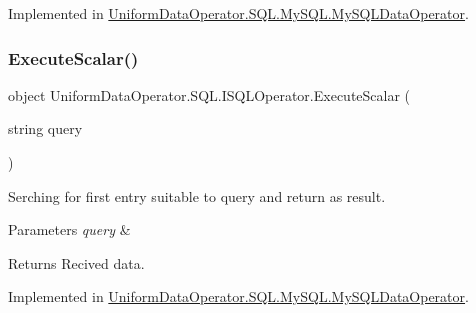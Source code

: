 Implemented in \mbox{\hyperlink{class_uniform_data_operator_1_1_s_q_l_1_1_my_s_q_l_1_1_my_s_q_l_data_operator_aef1f1d171818fffe2f0c0642de27596d}{Uniform\+Data\+Operator.\+S\+Q\+L.\+My\+S\+Q\+L.\+My\+S\+Q\+L\+Data\+Operator}}.

\mbox{\label{interface_uniform_data_operator_1_1_s_q_l_1_1_i_s_q_l_operator_a8a39200efe4781edee40151982940f75}} 
\subsubsection{\texorpdfstring{Execute\+Scalar()}{ExecuteScalar()}}
{\footnotesize\ttfamily object Uniform\+Data\+Operator.\+S\+Q\+L.\+I\+S\+Q\+L\+Operator.\+Execute\+Scalar (\begin{DoxyParamCaption}\item[{string}]{query }\end{DoxyParamCaption})}



Serching for first entry suitable to query and return as result. 


\begin{DoxyParams}{Parameters}
{\em query} & \\
\hline
\end{DoxyParams}
\begin{DoxyReturn}{Returns}
Recived data.
\end{DoxyReturn}


Implemented in \mbox{\hyperlink{class_uniform_data_operator_1_1_s_q_l_1_1_my_s_q_l_1_1_my_s_q_l_data_operator_a0dbc2a3ee5fb7768868138bbd2d9967e}{Uniform\+Data\+Operator.\+S\+Q\+L.\+My\+S\+Q\+L.\+My\+S\+Q\+L\+Data\+Operator}}.

\mbox{\label{interface_uniform_data_operator_1_1_s_q_l_1_1_i_s_q_l_operator_a653f3722befbd300e9ae8ae6f363790f}} 
